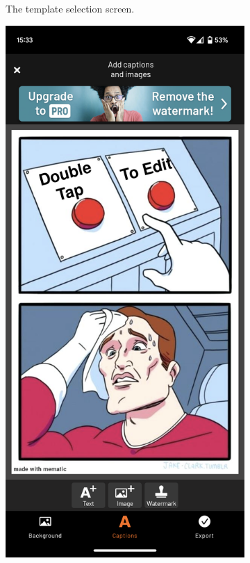 \begin{figure}
\begin{subfigure}{0.3\textwidth}
        \caption{The template selection screen.}
        \label{fig:mematic-template-selection}
    \end{subfigure}
    \begin{subfigure}{0.3\textwidth}
        \centering
        \includegraphics[width=\linewidth]{text/img/mematic/meme-edit.png}

\end{subfigure}
\end{figure}
